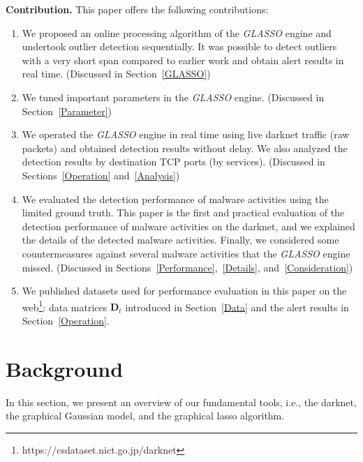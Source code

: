 \documentclass[conference]{IEEEtran}
\begin{document}
\noindent
\textbf{Contribution.}\space\space
This paper offers the following contributions:
\begin{enumerate}
	\item We proposed an online processing algorithm of the \textit{GLASSO} engine and undertook outlier detection sequentially.
  It was possible to detect outliers with a very short span compared to earlier work and obtain alert results in real time. (Discussed in Section~\ref{GLASSO})
	\item We tuned important parameters in the \textit{GLASSO} engine. (Discussed in Section~\ref{Parameter})
	\item We operated the \textit{GLASSO} engine in real time using live darknet traffic (raw packets) and obtained detection results without delay.
  We also analyzed the detection results by destination TCP ports (by services). (Discussed in Sections~\ref{Operation} and~\ref{Analysis})
  \item We evaluated the detection performance of malware activities using the limited ground truth.
  This paper is the first and practical evaluation of the detection performance of malware activities on the darknet, and we explained the details of the detected malware activities.
  Finally, we considered some countermeasures against several malware activities that the \textit{GLASSO} engine missed. (Discussed in Sections~\ref{Performance},~\ref{Details}, and~\ref{Consideration})
  \item We published datasets used for performance evaluation in this paper on the web\footnote{https://csdataset.nict.go.jp/darknet}: data matrices $\bm{D}_t$ introduced in Section~\ref{Data} and the alert results in Section~\ref{Operation}.
\end{enumerate}



\section{Background}
In this section, we present an overview of our fundamental tools, i.e., the darknet, the graphical Gaussian model, and the graphical lasso algorithm.
\end{document}
